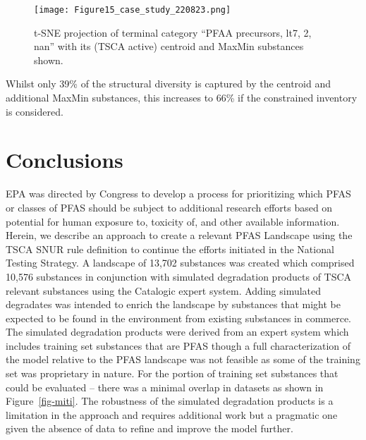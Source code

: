 \documentclass[
  super,
  preprint,
  3p]{elsarticle}
\begin{document}
\begin{figure}[H]

{\centering \texttt{[image: Figure15\_case\_study\_220823.png]}

}

\caption{\label{fig-case-study}t-SNE projection of terminal category
``PFAA precursors, lt7, 2, nan'' with its (TSCA active) centroid and
MaxMin substances shown.}

\end{figure}

Whilst only 39\% of the structural diversity is captured by the centroid
and additional MaxMin substances, this increases to 66\% if the
constrained inventory is considered.

\hypertarget{conclusions}{%
\section{Conclusions}\label{conclusions}}

EPA was directed by Congress to develop a process for prioritizing which
PFAS or classes of PFAS should be subject to additional research efforts
based on potential for human exposure to, toxicity of, and other
available information. Herein, we describe an approach to create a
relevant PFAS Landscape using the TSCA SNUR rule definition to continue
the efforts initiated in the National Testing Strategy. A landscape of
13,702 substances was created which comprised 10,576 substances in
conjunction with simulated degradation products of TSCA relevant
substances using the Catalogic expert system. Adding simulated
degradates was intended to enrich the landscape by substances that might
be expected to be found in the environment from existing substances in
commerce. The simulated degradation products were derived from an expert
system which includes training set substances that are PFAS though a
full characterization of the model relative to the PFAS landscape was
not feasible as some of the training set was proprietary in nature. For
the portion of training set substances that could be evaluated -- there
was a minimal overlap in datasets as shown in Figure~\ref{fig-miti}. The
robustness of the simulated degradation products is a limitation in the
approach and requires additional work but a pragmatic one given the
absence of data to refine and improve the model further.
\end{document}
